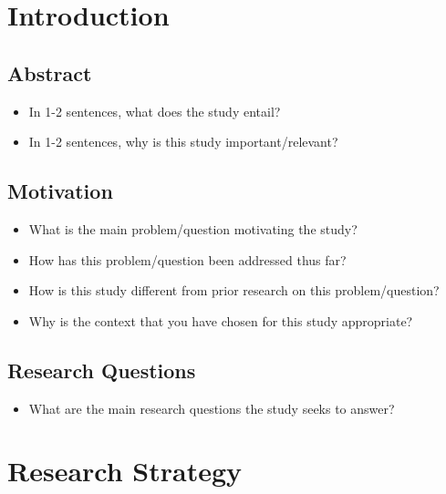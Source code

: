 \documentclass[12pt]{article}
\begin{document}
\sloppy
\maketitle

\renewcommand{\cftsecleader}{\cftdotfill{\cftdotsep}}
\tableofcontents

\clearpage

\section{Introduction}

\subsection{Abstract}

\begin{itemize}
\item In 1-2 sentences, what does the study entail?
\item In 1-2 sentences, why is this study important/relevant?
\end{itemize}

\subsection{Motivation}

\begin{itemize}
\item What is the main problem/question motivating the study?
\item How has this problem/question been addressed thus far?
\item How is this study different from prior research on this problem/question? 
\item Why is the context that you have chosen for this study appropriate?
\end{itemize}

\subsection{Research Questions}

\begin{itemize}
\item What are the main research questions the study seeks to answer?
\end{itemize}

\section{Research Strategy}
\end{document}
